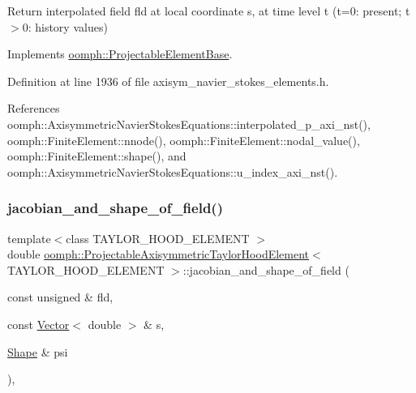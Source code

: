 Return interpolated field fld at local coordinate s, at time level t (t=0\+: present; t$>$0\+: history values) 



Implements \hyperlink{classoomph_1_1ProjectableElementBase_ae4da5b565b6d333be2f5920f7be763cd}{oomph\+::\+Projectable\+Element\+Base}.



Definition at line 1936 of file axisym\+\_\+navier\+\_\+stokes\+\_\+elements.\+h.



References oomph\+::\+Axisymmetric\+Navier\+Stokes\+Equations\+::interpolated\+\_\+p\+\_\+axi\+\_\+nst(), oomph\+::\+Finite\+Element\+::nnode(), oomph\+::\+Finite\+Element\+::nodal\+\_\+value(), oomph\+::\+Finite\+Element\+::shape(), and oomph\+::\+Axisymmetric\+Navier\+Stokes\+Equations\+::u\+\_\+index\+\_\+axi\+\_\+nst().

\mbox{\label{classoomph_1_1ProjectableAxisymmetricTaylorHoodElement_a3cedb09c44a4cc735c5dcd1175afe704}} 
\subsubsection{\texorpdfstring{jacobian\+\_\+and\+\_\+shape\+\_\+of\+\_\+field()}{jacobian\_and\_shape\_of\_field()}}
{\footnotesize\ttfamily template$<$class T\+A\+Y\+L\+O\+R\+\_\+\+H\+O\+O\+D\+\_\+\+E\+L\+E\+M\+E\+NT $>$ \\
double \hyperlink{classoomph_1_1ProjectableAxisymmetricTaylorHoodElement}{oomph\+::\+Projectable\+Axisymmetric\+Taylor\+Hood\+Element}$<$ T\+A\+Y\+L\+O\+R\+\_\+\+H\+O\+O\+D\+\_\+\+E\+L\+E\+M\+E\+NT $>$\+::jacobian\+\_\+and\+\_\+shape\+\_\+of\+\_\+field (\begin{DoxyParamCaption}\item[{const unsigned \&}]{fld,  }\item[{const \hyperlink{classoomph_1_1Vector}{Vector}$<$ double $>$ \&}]{s,  }\item[{\hyperlink{classoomph_1_1Shape}{Shape} \&}]{psi }\end{DoxyParamCaption})\hspace{0.3cm}{\ttfamily [inline]}, {\ttfamily [virtual]}}



